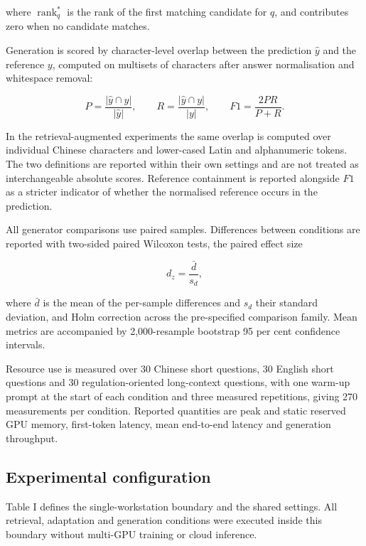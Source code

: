 \documentclass{article}
\DeclareMathOperator{\rank}{rank}
\begin{document}
where $\rank_q^{*}$ is the rank of the first matching candidate for $q$, and contributes zero when no candidate matches.

Generation is scored by character-level overlap between the prediction $\hat{y}$ and the reference $y$, computed on multisets of characters after answer normalisation and whitespace removal:

\begin{equation}
P=\frac{|\hat{y}\cap y|}{|\hat{y}|},\qquad
R=\frac{|\hat{y}\cap y|}{|y|},\qquad
F1=\frac{2PR}{P+R}.
\end{equation}

In the retrieval-augmented experiments the same overlap is computed over individual Chinese characters and lower-cased Latin and alphanumeric tokens. The two definitions are reported within their own settings and are not treated as interchangeable absolute scores. Reference containment is reported alongside $F1$ as a stricter indicator of whether the normalised reference occurs in the prediction.

All generator comparisons use paired samples. Differences between conditions are reported with two-sided paired Wilcoxon tests, the paired effect size

\begin{equation}
d_z=\frac{\bar{d}}{s_d},
\end{equation}

where $\bar{d}$ is the mean of the per-sample differences and $s_d$ their standard deviation, and Holm correction across the pre-specified comparison family. Mean metrics are accompanied by 2,000-resample bootstrap 95 per cent confidence intervals.

Resource use is measured over 30 Chinese short questions, 30 English short questions and 30 regulation-oriented long-context questions, with one warm-up prompt at the start of each condition and three measured repetitions, giving 270 measurements per condition. Reported quantities are peak and static reserved GPU memory, first-token latency, mean end-to-end latency and generation throughput.

\subsection{Experimental configuration}

Table I defines the single-workstation boundary and the shared settings. All retrieval, adaptation and generation conditions were executed inside this boundary without multi-GPU training or cloud inference.
\end{document}

